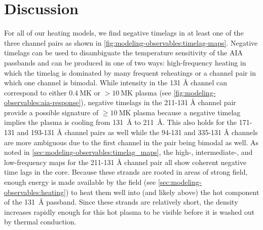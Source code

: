 \section{Discussion}\label{sec:modeling-observables:discussion}

For all of our heating models, we find negative timelags in at least one of the three channel pairs as shown in \autoref{fig:modeling-observables:timelag-maps}. Negative timelags can be used to disambiguate the temperature sensitivity of the AIA passbands and can be produced in one of two ways: high-frequency heating in which the timelag is dominated by many frequent reheatings or a channel pair in which one channel is bimodal. While intensity in the 131 \AA{} channel can correspond to either $\SI{0.4}{\mega\kelvin}$ or $>\SI{10}{\mega\kelvin}$ plasma (see \autoref{fig:modeling-observables:aia-response}), negative timelags in the 211-131 \si{\angstrom} channel pair provide a possible signature of $\ge\SI{10}{\mega\kelvin}$ plasma because a negative timelag implies the plasma is cooling from \SI{131}{\angstrom} to \SI{211}{\angstrom}. This also holds for the 171-131 and 193-131 \si{\angstrom} channel pairs as well while the 94-131 and 335-131 \si{\angstrom} channels are more ambiguous due to the first channel in the pair being bimodal as well. As noted in \autoref{sec:modeling-observables:timelag_maps}, the high-, intermediate-, and low-frequency maps for the 211-131 \si{\angstrom} channel pair all show coherent negative time lags in the core. Because these strands are rooted in areas of strong field, enough energy is made available by the field (see \autoref{sec:modeling-observables:heating}) to heat them well into (and likely above) the hot component of the \SI{131}{\angstrom} passband. Since these strands are relatively short, the density increases rapidly enough for this hot plasma to be visible before it is washed out by thermal conduction.

